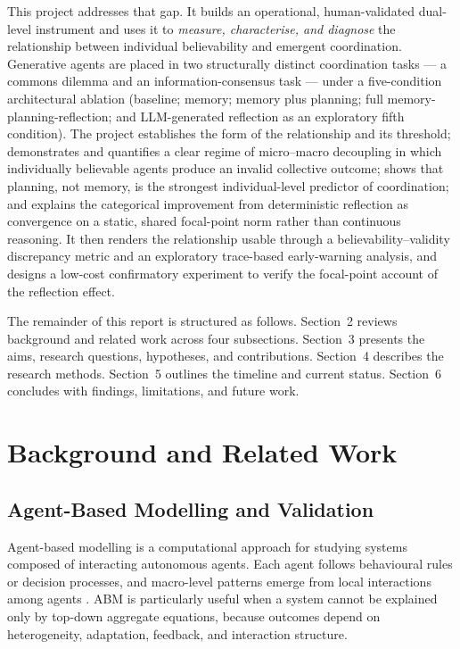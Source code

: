 \documentclass[11pt]{article}
\begin{document}
This project addresses that gap. It builds an operational, human-validated dual-level instrument and uses it to \emph{measure, characterise, and diagnose} the relationship between individual believability and emergent coordination. Generative agents are placed in two structurally distinct coordination tasks --- a commons dilemma and an information-consensus task --- under a five-condition architectural ablation (baseline; memory; memory plus planning; full memory-planning-reflection; and LLM-generated reflection as an exploratory fifth condition). The project establishes the form of the relationship and its threshold; demonstrates and quantifies a clear regime of micro--macro decoupling in which individually believable agents produce an invalid collective outcome; shows that planning, not memory, is the strongest individual-level predictor of coordination; and explains the categorical improvement from deterministic reflection as convergence on a static, shared focal-point norm rather than continuous reasoning. It then renders the relationship usable through a believability--validity discrepancy metric and an exploratory trace-based early-warning analysis, and designs a low-cost confirmatory experiment to verify the focal-point account of the reflection effect.

The remainder of this report is structured as follows. Section~2 reviews background and related work across four subsections. Section~3 presents the aims, research questions, hypotheses, and contributions. Section~4 describes the research methods. Section~5 outlines the timeline and current status. Section~6 concludes with findings, limitations, and future work.

\section{Background and Related Work}

\subsection{Agent-Based Modelling and Validation}
Agent-based modelling is a computational approach for studying systems composed of
interacting autonomous agents. Each agent follows behavioural rules or decision processes,
and macro-level patterns emerge from local interactions among agents \cite{epstein1996growing}.
ABM is particularly useful when a system cannot be explained only by top-down aggregate
equations, because outcomes depend on heterogeneity, adaptation, feedback, and interaction
structure.
\end{document}
